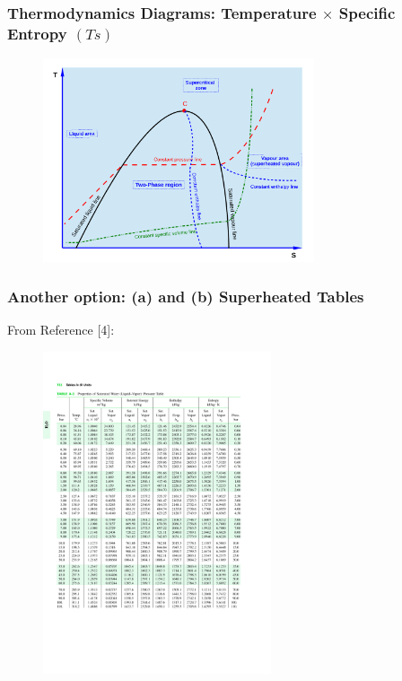 \documentclass[10pt,compress,unknownkeysallowed]{beamer}
\begin{document}
\begin{frame}
 \frametitle{Thermodynamics Diagrams: Temperature $\times$ Specific Entropy $(Ts)$}
  \begin{center}
   \begin{figure}
      \includegraphics[width=8cm,height=7.cm,clip]{../Pics/TS_Diag_Schematics}
   \end{figure}
   \end{center}
\end{frame}

\begin{frame}
  \frametitle{Another option: (a)  and (b) Superheated Tables}
\scriptsize{From Reference [4]:}\vspace{-.8cm}
   \begin{center}
   \begin{figure}
      \includegraphics[width=9.cm,height=9.5cm,clip]{../Pics/WaterSatTable}
   \end{figure}
   \end{center}
\end{frame}
\end{document}
